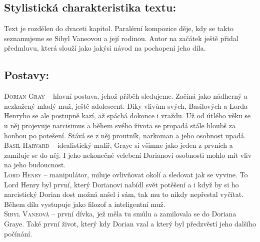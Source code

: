 \documentclass[A4paper]{extarticle} %
\begin{document}


\subsection*{Stylistická charakteristika textu:}
\noindent 
Text je rozdělen do dvaceti kapitol.
Paralérní kompozice děje, kdy se takto seznamujeme se Sibyl Vaneovou a její rodinou.
Autor na začátek ještě přidal předmluvu, která slouží jako jakýsi návod na pochopení jeho díla.

\subsection*{Postavy:}
\noindent 
\textsc{Dorian Gray --} hlavní postava, jehož příběh sledujeme. Začíná jako nádherný a nezkažený mladý muž, ještě adolescent. Díky vlivům svých, Basilových a Lorda Henryho se ale postupně kazí, až spáchá dokonce i vraždu.
Už od útlého věku se u něj projevuje narcisimus a během svého života se propadá stále hloubš za honbou po potešení.
Stává se z něj proutník, narkoman a jeho osobnost upadá. \\
\textsc{Basil Harvard --} idealistický malíř, Graye si všimne jako jeden z prvních a zamiluje se do něj.
I jeho nekonečné velebení Dorianovi osobnosti mohlo mít vliv na jeho budoucnost. \\
\textsc{Lord Henry --} manipulátor, miluje ovlivňovat okolí a sledovat jak se vyvine.
To Lord Henry byl první, který Dorianovi nabídl svět potěšení a i když by si ho narcistický Dorian dost možná našel i sám, tak mu to nikdy nepřestal vyčítat.
Během díla vystupuje jako filozof a inteligentní muž. \\
\textsc{Sibyl Vaneová --} první dívka, jež měla tu smůlu a zamilovala se do Doriana Graye. Také první život, který kdy Dorian vzal a který byl předzvěstí jeho dalšího počínání.
\end{document}
